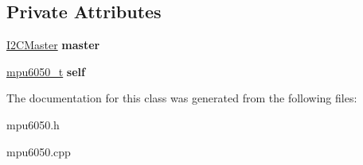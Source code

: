 \subsection*{Private Attributes}
\begin{DoxyCompactItemize}
\item 
\mbox{\label{classMpu6050_a268012468e495b0888a659dc0458a72c}} 
\hyperlink{classI2CMaster}{I2\+C\+Master} {\bfseries master}
\item 
\mbox{\label{classMpu6050_a53fb7f46e549c2fc2a40a3fcca31825f}} 
\hyperlink{structmpu6050__t}{mpu6050\+\_\+t} {\bfseries self}
\end{DoxyCompactItemize}


The documentation for this class was generated from the following files\+:\begin{DoxyCompactItemize}
\item 
mpu6050.\+h\item 
mpu6050.\+cpp\end{DoxyCompactItemize}
